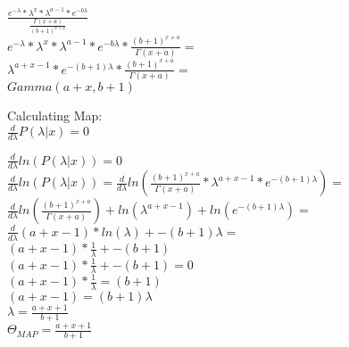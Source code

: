 $\frac{{e^{-\lambda} * \lambda^x} * \lambda^{a-1} * e^{-b\lambda} }{ \frac{\Gamma(x+a)}{(b+1)^{x+a}}} $ \\

${e^{-\lambda} * \lambda^x} * \lambda^{a-1} * e^{-b\lambda} * \frac{(b+1)^{x+a}}{\Gamma(x+a)} = $ \\ 
$\lambda^{a+x-1} * e^{-(b+1)\lambda} * \frac{(b+1)^{x+a}}{\Gamma(x+a)} = $ \\
$Gamma(a+x,b+1)$

Calculating Map: \\
$\frac{d}{d\lambda} P(\lambda | x)  = 0$

$\frac{d}{d\lambda} ln (P(\lambda | x))  = 0$
$\frac{d}{d\lambda} ln (P(\lambda | x))   = \frac{d}{d\lambda} ln(\frac{(b+1)^{x+a}}{\Gamma(x+a)}*\lambda^{a+x-1} * e^{-(b+1)\lambda}) = $ \\
$\frac{d}{d\lambda} ln(\frac{(b+1)^{x+a}}{\Gamma(x+a)})+ ln(\lambda^{a+x-1}) + ln(e^{-(b+1)\lambda}) = $ \\
$\frac{d}{d\lambda}(a+x-1)*ln(\lambda) + {-(b+1)\lambda} = $ \\
$(a+x-1)*\frac{1}{\lambda} + -(b+1)$ \\

$(a+x-1)*\frac{1}{\lambda} + -(b+1) = 0$ \\
$(a+x-1)*\frac{1}{\lambda} = (b+1)$ \\
$(a+x-1) = (b+1) \lambda$ \\
$\lambda = \frac{a+x+1}{b+1}$ \\
$\Theta_{MAP} = \frac{a+x+1}{b+1}$
